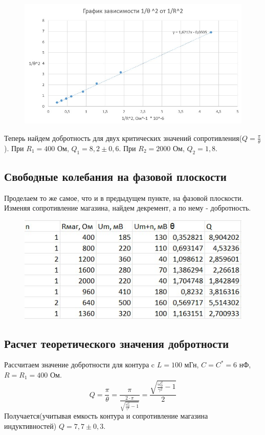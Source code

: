 \documentclass[a4paper,12pt]{article}
\begin{document}
\begin{figure}[H]
	\begin{center}    		
    		\includegraphics[width=1\textwidth]{graphik2.3.jpg}
    	\end{center}
\end{figure}

Теперь найдем добротность для двух критических значений сопротивления($Q = \frac{\pi}{\theta}$). При $R_1 = 400$ Ом, $Q_1 = 8,2 \pm 0,6$. При $R_2 = 2000$ Ом, $Q_2 = 1,8$.
\subsection*{Свободные колебания на фазовой плоскости}
Проделаем то же самое, что и в предыдущем пункте, на фазовой плоскости. Изменяя сопротивление магазина, найдем декремент, а по нему - добротность.

\begin{figure}[H]
	\begin{center}
    		\includegraphics[width=.5\textwidth]{tabliza2.4.jpg}
    	\end{center}
\end{figure}
\subsection*{Расчет теоретического значения добротности}
Рассчитаем значение добротности для контура c $L = 100$ мГн, $C = C^\ast = 6$ нФ, $R = R_1 = 400$ Ом.
\[Q = \frac{\pi}{\theta} = \frac{\pi}{\frac{2 \cdot \pi}{\sqrt{\frac{\omega_0^2}{\gamma^2} - 1}}} = \frac{\sqrt{\frac{\omega_0^2}{\gamma^2} - 1}}{2}\]
Получается(учитывая емкость контура и сопротивление магазина индуктивностей) $Q = 7,7 \pm 0,3$.
\end{document}
